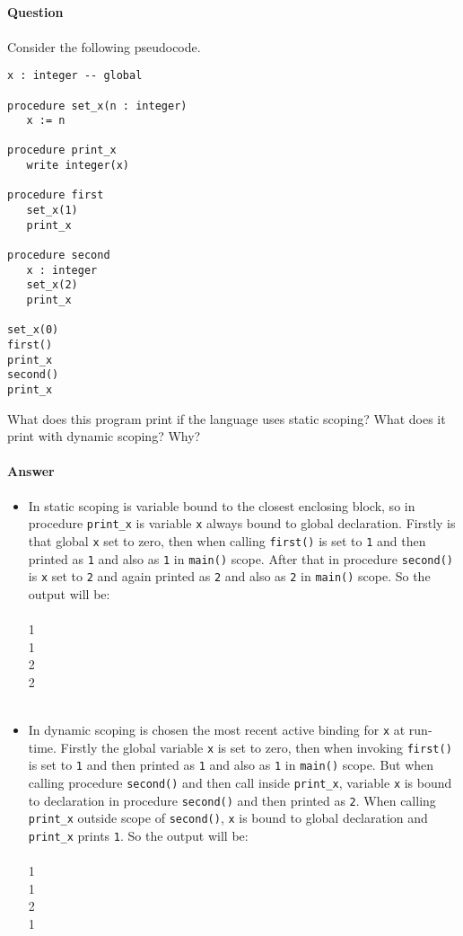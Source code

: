 \documentclass[5pt]{article}
\begin{document}
\setcounter{subsection}{13}
\subsection{}

\paragraph{Question}
Consider the following pseudocode.

\begin{verbatim}
x : integer -- global

procedure set_x(n : integer)
   x := n
   
procedure print_x
   write integer(x)
   
procedure first
   set_x(1)
   print_x
   
procedure second
   x : integer
   set_x(2)
   print_x

set_x(0)
first()
print_x
second()
print_x
\end{verbatim}
What does this program print if the language uses static scoping? What does
it print with dynamic scoping? Why?
\newpage
\paragraph{Answer}
\begin{itemize}
\item In static scoping is variable bound to the closest enclosing block, so in
procedure \verb|print_x| is variable \verb|x| always bound to global
declaration. Firstly is that global \verb|x| set to zero, then when calling
\verb|first()| is set to \verb|1| and then printed as \verb|1| and also as
\verb|1| in \verb|main()| scope. After that in procedure \verb|second()| is
\verb|x| set to \verb|2| and again printed as \verb|2| and also as
\verb|2| in \verb|main()| scope. So the output will be:\\
\\
1\\
1\\
2\\
2\\
\\
\item In dynamic scoping is chosen the most recent active binding for \verb|x|
at run-time. Firstly the global variable \verb|x| is set to
zero, then when invoking \verb|first()| is set to \verb|1| and then printed as
\verb|1| and also as \verb|1| in \verb|main()| scope. But when calling procedure \verb|second()| and
then call inside \verb|print_x|, variable \verb|x| is bound to declaration in
procedure \verb|second()| and then printed as \verb|2|. When calling
\verb|print_x| outside scope of \verb|second()|, \verb|x| is bound to global declaration and \verb|print_x| prints \verb|1|. So the output will be:\\
\\
1\\
1\\
2\\
1\\
\end{itemize}
\end{document}
